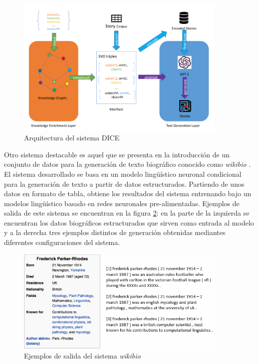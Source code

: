 \begin{figure}[!h]
	\centering
	\includegraphics[width=0.9\textwidth]{Imagenes/Bitmap/02EstadoDeLaCuestion/DICE}%
	\caption{Arquitectura del sistema DICE %
		\label{fig:DICE}}
\end{figure}

Otro sistema destacable es aquel que se presenta en la introducción de un conjunto de datos para la generación de texto biográfico conocido como \textit{wikibio} \citep{lebret-etal-2016-neural}. El sistema desarrollado se basa en un modelo lingüístico neuronal condicional para la generación de texto a partir de datos estructurados. Partiendo de unos datos en formato de tabla, obtiene los resultados del sistema entrenando bajo un modelos lingüístico basado en redes neuronales pre-alimentadas. Ejemplos de salida de este sistema se encuentran en la figura \ref{fig:wikibio}: en la parte de la izquierda se encuentran los datos biográficos estructurados que sirven como entrada al modelo y a la derecha tres ejemplos distintos de generación obtenidas mediantes diferentes configuraciones del sistema.

\begin{figure}[!h]
	\centering
	\includegraphics[width=0.9\textwidth]{Imagenes/Bitmap/02EstadoDeLaCuestion/wikibio}%
	\caption{Ejemplos de salida del sistema \textit{wikibio} %
		\label{fig:wikibio}}
\end{figure}


